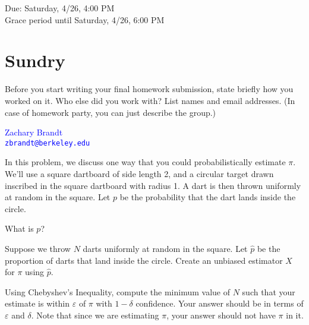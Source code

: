 \documentclass[11pt]{article}
\begin{document}
\maketitle
\fontsize{12}{15}\selectfont

\begin{center}
    Due: Saturday, 4/26, 4:00 PM \\
    Grace period until Saturday, 4/26, 6:00 PM \\
\end{center}

\section*{Sundry}
Before you start writing your final homework submission, state briefly how you 
worked on it. Who else did you work with?  List names and email addresses. (In 
case of homework party, you can just describe the group.)

\begin{center}
    \textcolor{blue}{
        Zachary Brandt \\
        \nolinkurl{zbrandt@berkeley.edu}
    }
\end{center}

\vspace{15pt}


In this problem, we discuss one way that you could probabilistically estimate 
$\pi$. We'll use a square dartboard of side length 2, and a circular target 
drawn inscribed in the square dartboard with radius 1. A dart is then thrown 
uniformly at random in the square. Let $p$ be the probability that the dart 
lands inside the circle.

\begin{Parts}
    \item What is $p$?
	\item Suppose we throw $N$ darts uniformly at random in the square. Let 
    $\hat{p}$ be the proportion of darts that land inside the circle. Create an 
    unbiased estimator $X$ for $\pi$ using $\hat{p}$.
	\item Using Chebyshev's Inequality, compute the minimum value of $N$ such 
    that your estimate is within $\varepsilon$ of $\pi$ with $1 - \delta$ 
    confidence. Your answer should be in terms of $\varepsilon$ and $\delta$. 
    Note that since we are estimating $\pi$, your answer should not have $\pi$ 
    in it.
\end{Parts}
\end{document}
